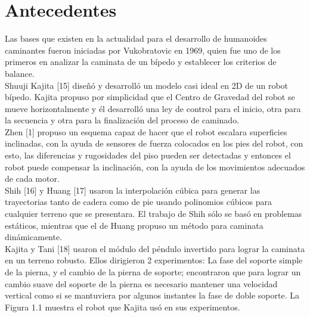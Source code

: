 \chapter*{Antecedentes}


Las bases que existen en la actualidad para el desarrollo de humanoides caminantes fueron iniciadas por Vukobratovic en 1969, quien fue uno de los primeros en analizar la caminata de un bípedo y establecer los criterios de balance.\\

Shuuji Kajita [15] diseñó y desarrolló un modelo casi ideal en 2D de un robot bípedo. Kajita propuso por simplicidad que el Centro de Gravedad del robot se mueve horizontalmente y él desarrolló una ley de control para el inicio, otra para la secuencia y otra para la finalización del proceso de caminado.\\

Zhen [1] propuso un esquema capaz de hacer que el robot escalara superficies inclinadas, con la ayuda de sensores de fuerza colocados en los pies del robot, con esto, las diferencias y rugosidades del piso pueden ser detectadas y entonces el robot puede compensar la inclinación, con la ayuda de los movimientos adecuados de cada motor.\\

Shih [16] y Huang [17] usaron la interpolación cúbica para generar las trayectorias tanto de cadera como de pie usando polinomios cúbicos para cualquier terreno que se presentara. El trabajo de Shih sólo se basó en problemas estáticos, mientras que el de Huang propuso un método para caminata dinámicamente.\\

Kajita y Tani [18] usaron el módulo del péndulo invertido para lograr la caminata en un terreno robusto. Ellos dirigieron 2 experimentos: La fase del soporte simple de la pierna, y el cambio de la pierna de soporte; encontraron que para lograr un cambio suave del soporte de la pierna es necesario mantener una velocidad vertical como si se mantuviera por algunos instantes la fase de doble soporte. La Figura 1.1 muestra el robot que Kajita usó en sus experimentos.\\ 